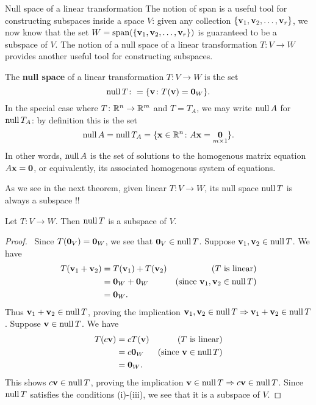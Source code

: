 \begin{frame}{Null space of a linear transformation}
The notion of span is a useful tool for constructing subspaces inside a space $V$: given any collection $\{{\mathbf v}_1, {\mathbf v}_2, \dots, {\mathbf v}_r\}$, we now know that the set  $W=\operatorname{span}(\{{\mathbf v}_1,{\mathbf v}_2,\dots, {\mathbf v}_r\})$ is guaranteed to be a subspace of $V$. 
\bpause 
The notion of a \alert{null space} of a linear transformation $T\colon V\rightarrow W$ provides another useful tool for constructing subspaces. 
\begin{definition}
The {\bf null space} of a linear transformation $T\colon V\rightarrow W$ is the set 
\[
\operatorname{null} T\colon =\{{\mathbf v}\colon T({\mathbf v})={\mathbf 0}_W \}.
\]
\pause 
In the special case where $T\colon {\mathbb R}^n\rightarrow {\mathbb R}^m$ and $T=T_A$, we may write $\operatorname{null} A$ for $\operatorname{null} T_A$: by definition this is the set 
\[
\operatorname{null} A=\operatorname{null} T_A=\{{\mathbf x}\in {\mathbb R}^n\colon A{\mathbf x}=\underset{m\times 1}{{\mathbf 0}}\}.
\]
In other words, $\operatorname{null} A$ is the set of solutions to the homogenous matrix equation $A{\mathbf x}={\mathbf 0}$, or equivalently, its associated homogenous system of equations. 
\end{definition}
\pause
As we see in the next theorem, given linear $T\colon V\rightarrow W$, its null space $\operatorname{null} T$ is always a \alert{subspace} !!
\end{frame}
\begin{frame}
 \begin{theorem}
 Let $T\colon V\rightarrow W$. Then $\operatorname{null} T$ is a subspace of $V$. 
 \end{theorem}
 \pause
 \begin{proof}
 \ 
 \bb[(i)]
 \ii Since $T({\mathbf 0}_V)={\mathbf 0}_W$, we see that ${\mathbf 0}_V\in \operatorname{null} T$. 
 \pause
 \ii Suppose ${\mathbf v}_1, {\mathbf v}_2\in \operatorname{null} T$. We have 
 \begin{align*}
 T({\mathbf v}_1+{\mathbf v}_2)&=T({\mathbf v}_1)+T({\mathbf v}_2) &\text{($T$ is linear)}\\
 &={\mathbf 0}_W+{\mathbf 0}_W &\text{(since ${\mathbf v}_1,{\mathbf v}_2\in\operatorname{null} T$)}\\
 &={\mathbf 0}_W.
 \end{align*}
 Thus ${\mathbf v}_1+{\mathbf v}_2\in \operatorname{null} T$, proving the implication ${\mathbf v}_1,{\mathbf v}_2\in\operatorname{null} T\Rightarrow {\mathbf v}_1+{\mathbf v}_2\in\operatorname{null} T$. 
 \pause
 \ii Suppose ${\mathbf v}\in\operatorname{null} T$. We have 
 \begin{align*}
 T(c{\mathbf v})&=cT({\mathbf v}) &\text{($T$ is linear)}\\
 &=c{\mathbf 0}_W &\text{(since ${\mathbf v}\in\operatorname{null} T$)}\\
 &={\mathbf 0}_W.
 \end{align*}
 This shows $c{\mathbf v}\in\operatorname{null} T$, proving the implication ${\mathbf v}\in\operatorname{null} T\Rightarrow c{\mathbf v}\in\operatorname{null} T$. 
 \ee
  \pause Since $\operatorname{null} T$ satisfies the conditions (i)-(iii), we see that it is a subspace of $V$. 

 \end{proof}
\end{frame}
